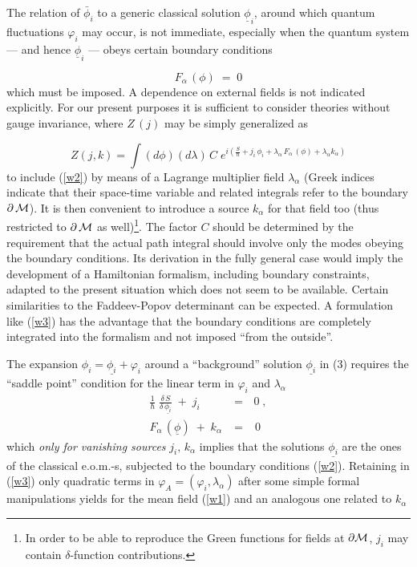 \documentclass[a4paper,12pt]{article}
\def\ul{\underline}
\begin{document}
The relation of $\bar{\phi}_i$ to a generic classical 
solution $\ul{\phi}_i$, around which quantum fluctuations 
$\varphi_i$ may 
occur, is not immediate, especially when the quantum system ---  and hence 
$\ul{\phi}_i$ --- obeys certain  boundary conditions

\begin{equation}
F_{\alpha}\,(\phi)\; = \; 0 \label{w2}
\end{equation}
which must be imposed. 
A dependence on external fields is not indicated 
explicitly. 
For our present purposes it is sufficient to consider 
theories without gauge invariance, where $Z\,(j)$ may be 
simply generalized as

\begin{equation}
Z (j,k) = \int (d \phi) (d \lambda)\, C\; e^{ i (\frac{S}{\hbar} + 
j_i\, \phi_i + \lambda_\alpha\, F_{\alpha}\,(\phi) + 
\lambda_\alpha k_\alpha)} \label{w3}
\end{equation}
to include (\ref{w2}) by means of a Lagrange multiplier field 
$\lambda_\alpha$ (Greek indices indicate that their 
space-time variable and related integrals refer to the 
boundary $\partial\,{\cal M}$). It is then convenient to introduce 
a source $k_\alpha$ for that field too (thus restricted to 
$\partial \, {\cal M}$ as well)\footnote{In order to be able to
reproduce the Green functions for fields at $\partial{\cal M}$,
$j_i$ may contain $\delta$-function contributions.}. 
The factor  $C$ should be  
determined by the requirement that the actual path integral 
should involve only the modes obeying the boundary 
conditions. Its derivation in the fully general case 
would imply the development of a Hamiltonian formalism, 
including boundary constraints, adapted to the present 
situation which does not seem to be available. Certain 
similarities to the Faddeev-Popov determinant can be 
expected. A formulation like (\ref{w3}) has the 
advantage that the boundary conditions  are completely 
integrated into the formalism and not imposed ``from the 
outside''. 

The expansion $\phi_i = \ul{\phi_i} + \varphi_i$ around a 
``background'' solution $\ul{\phi_i}$ in (3) requires the 
``saddle point'' condition for the linear term in 
$\varphi_i$ and $\lambda_\alpha$
\begin{eqnarray}
\frac{1}{\hbar}\; \frac{\delta\, S}{\delta\, 
\ul{\phi_i}} \; + \; j_i \; & = & \, 0 \; ,\label{w4} \\
F_{\alpha}\, (\ul{\phi}) \; + \; k_\alpha \; & = & \; 0 \label{w5}
\end{eqnarray}
which {\em only for  vanishing sources} $j_i, \, k_\alpha$ implies that 
the solutions $\ul{\phi_i}$ are the ones of the classical 
e.o.m.-s, subjected to the boundary conditions (\ref{w2}). 
Retaining in (\ref{w3}) only quadratic terms in 
$\varphi_A = (\varphi_i, \lambda_\alpha)$  after some 
simple formal manipulations yields for the mean field (\ref{w1}) 
and an analogous one related to $k_\alpha$ 
\end{document}
